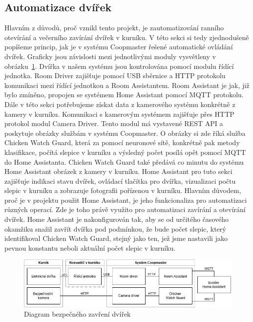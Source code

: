 \subsection{Automatizace dvířek}
Hlavním z důvodů, proč vznikl tento projekt, je zautomatizování ranního otevírání a večerního zavírání dvířek v kurníku.
V této sekci si tedy zjednodušeně popíšeme princip, jak je v systému Coopmaster řešené automatické ovládání dvířek.
Graficky jsou závislosti mezi jednotlivými moduly vysvětleny v obrázku~\ref{fig:automatizace_dvirek}.\newline
Dvířka v našem systému jsou kontrolována pomocí modulu řídící jednotka.
Room Driver zajišťuje pomocí USB sběrnice a HTTP protokolu komunikaci mezi řídící jednotkou a Room Assistantem.
Room Assistant je jak, již bylo zmíněno, propojen se systémem Home Assistant pomocí MQTT protokolu.
Dále v této sekci potřebujeme získat data z kamerového systému konkrétně z kamery v kurníku.
Komunikaci s kamerovým systémem zajišťuje přes HTTP protokol modul Camera Driver.
Tento modul má vystavené REST API a poskytuje obrázky službám v systému Coopmaster.
O obrázky si zde říká služba Chicken Watch Guard, která za pomocí neuronové sítě, konkrétně pak metody klasifikace, počítá slepice v kurníku a výsledný počet posílá opět pomocí MQTT do Home Assistanta.
Chicken Watch Guard také předává co minutu do systému Home Assistant obrázek z kamery v kurníku.
Home Assistant pro tuto sekci zajišťuje indikaci stavu dvířek, ovládací tlačítka pro dvířka, vizualizaci počtu slepic v kurníku a zobrazuje fotografii pořízenou v kurníku.
Hlavním důvodem, proč je v projektu použit Home Assistant, je jeho funkcionaliza pro automatizaci různých operací.
Zde je toho právě využito pro automatizaci zavírání a otevírání dvířek.
Home Assistant je nakonfigurován tak, aby se od určitého časového okamžiku snažil zavřít dvířka pod podmínkou, že bude počet slepic, který identifikoval Chicken Watch Guard, stejný jako ten, jež jsme nastavili jako pevnou konstantu neboli aktuální počet slepic v kurníku.
\begin{figure}[h]
    \centering
    \includegraphics[width=\textwidth]{img/automatizace_dvirek}
    \caption{Diagram bezpečného zavření dvířek}
    \label{fig:automatizace_dvirek}
\end{figure}


